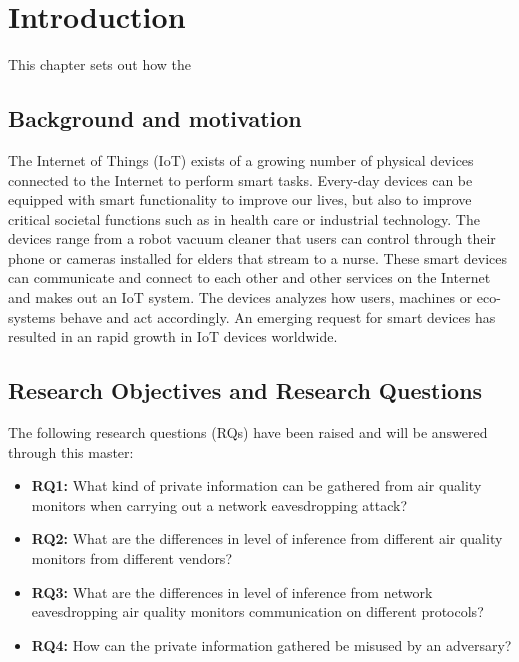 \chapter*{Introduction}
This chapter sets out how the 
\section*{Background and motivation}
The Internet of Things (IoT) exists of a growing number of physical devices connected to the Internet to perform smart tasks. \cite{IoTSurveyAl-Fuqaha} Every-day devices can be equipped with smart functionality to improve our lives, but also to improve critical societal functions such as in health care or industrial technology. The devices range from a robot vacuum cleaner that users can control through their phone or cameras installed for elders that stream to a nurse. These smart devices can communicate and connect to each other and other services on the Internet and makes out an IoT system. The devices analyzes how users, machines or eco-systems behave and act accordingly. An emerging request for smart devices has resulted in an rapid growth in IoT devices worldwide. %
\\

\section*{Research Objectives and Research Questions}

The following research questions (RQs) have been raised and will be answered through this master:
\begin{itemize}
    \item 
    \textbf{RQ1:} What kind of private information can be gathered from air quality monitors when carrying out a network eavesdropping attack?\\
    \item 
    \textbf{RQ2:} What are the differences in level of inference from different air quality monitors from different vendors?\\
    \item
    \textbf{RQ3:} What are the differences in level of inference from network eavesdropping air quality monitors communication on different protocols?\\
    \item 
    \textbf{RQ4:} How can the private information gathered be misused by an adversary?\\
\end{itemize}

